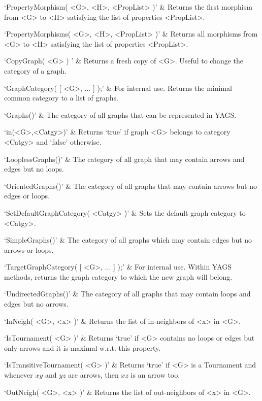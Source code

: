 `PropertyMorphism( <G>, <H>, <PropList> )' & 
Returns  the  first  morphism from <G> to <H> satisfying the list of properties <PropList>.

`PropertyMorphisms( <G>, <H>, <PropList> )' & 
Returns all morphisms from <G> to <H> satisfying the list of properties <PropList>.
\enditems


\beginitems
`CopyGraph( <G> ) ' & 
Returns a fresh copy of <G>. Useful to change the category of a graph.

`GraphCategory( [ <G>, ... ] );' & 
For internal use. Returns the minimal common category to a list of graphs.

`Graphs()' & 
The category of all  graphs  that  can  be  represented in YAGS.

`in(<G>,<Catgy>)' & 
Returns  `true'  if  graph  <G>  belongs  to  category <Catgy> and `false' otherwise.

`LooplessGraphs()' & 
The category of all graph that may contain arrows and edges but no loops.

`OrientedGraphs()' & 
The category of all graphs that may contain arrows but no edges or loops.

`SetDefaultGraphCategory( <Catgy> )' & 
Sets  the default graph category to <Catgy>.

`SimpleGraphs()' & 
The category of all graphs which may contain edges but no arrows or loops. 

`TargetGraphCategory( [ <G>, ... ] );' & 
For internal use. Within YAGS methods, returns the graph category to which the new graph will belong.

`UndirectedGraphs()' & 
The category of all graphs that may contain loops and edges but no arrows.
\enditems


\beginitems
`InNeigh( <G>, <x> )' & 
Returns the list of in-neighbors of <x> in <G>.

`IsTournament( <G> )' & 
Returns `true' if <G> contains no loops or edges but only arrows and it is maximal w.r.t. this property.

`IsTransitiveTournament( <G> )' & 
Returns `true' if <G> is a Tournament and whenever $xy$ and $yz$ are arrows, then $xz$ is an arrow too.

`OutNeigh( <G>, <x> )' & 
Returns the list of out-neighbors of <x> in <G>.
\enditems


